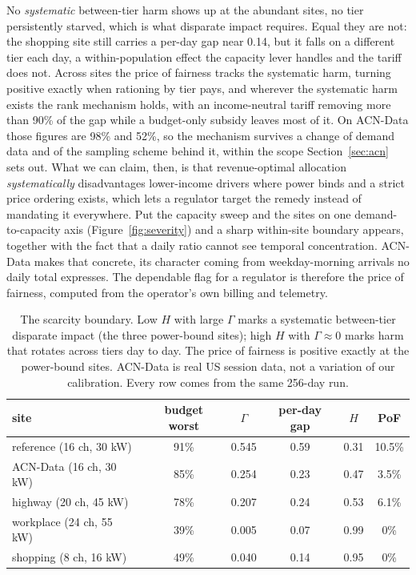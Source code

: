 \documentclass[manuscript, screen, review, anonymous]{acmart}
\begin{document}
No \emph{systematic} between-tier harm shows up at the abundant sites, no tier persistently starved, which is what disparate impact requires. Equal they are not: the shopping site still carries a per-day gap near 0.14, but it falls on a different tier each day, a within-population effect the capacity lever handles and the tariff does not. Across sites the price of fairness tracks the systematic harm, turning positive exactly when rationing by tier pays, and wherever the systematic harm exists the rank mechanism holds, with an income-neutral tariff removing more than 90\% of the gap while a budget-only subsidy leaves most of it. On ACN-Data those figures are 98\% and 52\%, so the mechanism survives a change of demand data and of the sampling scheme behind it, within the scope Section~\ref{sec:acn} sets out. What we can claim, then, is that revenue-optimal allocation \emph{systematically} disadvantages lower-income drivers where power binds and a strict price ordering exists, which lets a regulator target the remedy instead of mandating it everywhere. Put the capacity sweep and the sites on one demand-to-capacity axis (Figure~\ref{fig:severity}) and a sharp within-site boundary appears, together with the fact that a daily ratio cannot see temporal concentration. ACN-Data makes that concrete, its character coming from weekday-morning arrivals no daily total expresses. The dependable flag for a regulator is therefore the price of fairness, computed from the operator's own billing and telemetry.

\begin{table}[t]
\centering
\small
\caption{The scarcity boundary. Low $H$ with large $\Gamma$ marks a systematic between-tier disparate impact (the three power-bound sites); high $H$ with $\Gamma\approx 0$ marks harm that rotates across tiers day to day. The price of fairness is positive exactly at the power-bound sites. ACN-Data is real US session data, not a variation of our calibration. Every row comes from the same 256-day run.}
\label{tab:sites}
\begin{tabular}{lccccc}
\toprule
site & budget worst & $\Gamma$ & per-day gap & $H$ & PoF \\
\midrule
reference (16 ch, 30 kW) & 91\% & 0.545 & 0.59 & 0.31 & 10.5\% \\
ACN-Data (16 ch, 30 kW)  & 85\% & 0.254 & 0.23 & 0.47 & 3.5\% \\
highway (20 ch, 45 kW)   & 78\% & 0.207 & 0.24 & 0.53 & 6.1\% \\
workplace (24 ch, 55 kW) & 39\% & 0.005 & 0.07 & 0.99 & 0\% \\
shopping (8 ch, 16 kW)   & 49\% & 0.040 & 0.14 & 0.95 & 0\% \\
\bottomrule
\end{tabular}
\end{table}
\end{document}

